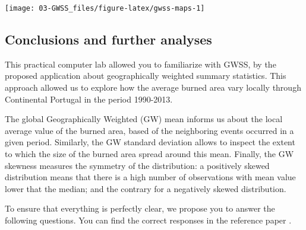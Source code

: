 \documentclass[
]{article}
\newenvironment{Shaded}{\begin{snugshade}}{\end{snugshade}}
\newcommand{\AttributeTok}[1]{\textcolor[rgb]{0.13,0.29,0.53}{#1}}
\newcommand{\DecValTok}[1]{\textcolor[rgb]{0.00,0.00,0.81}{#1}}
\newcommand{\FunctionTok}[1]{\textcolor[rgb]{0.13,0.29,0.53}{\textbf{#1}}}
\newcommand{\NormalTok}[1]{#1}
\newcommand{\SpecialCharTok}[1]{\textcolor[rgb]{0.81,0.36,0.00}{\textbf{#1}}}
\newcommand{\StringTok}[1]{\textcolor[rgb]{0.31,0.60,0.02}{#1}}
\begin{document}
\begin{Shaded}
\end{Shaded}

\begin{center}\texttt{[image: 03-GWSS\_files/figure-latex/gwss-maps-1]} \end{center}

\subsection{Conclusions and further analyses}\label{conclusions-and-further-analyses}

This practical computer lab allowed you to familiarize with GWSS, by the proposed application about geographically weighted summary statistics. This approach allowed us to explore how the average burned area vary locally through Continental Portugal in the period 1990-2013.

The global Geographically Weighted (GW) mean informs us about the local average value of the burned area, based of the neighboring events occurred in a given period. Similarly, the GW standard deviation allows to inspect the extent to which the size of the burned area spread around this mean. Finally, the GW skewness measures the symmetry of the distribution: a positively skewed distribution means that there is a high number of observations with mean value lower that the median; and the contrary for a negatively skewed distribution.

To ensure that everything is perfectly clear, we propose you to answer the following questions. You can find the correct responses in the reference paper \citep{tonini_evolution_2017}.
\end{document}
